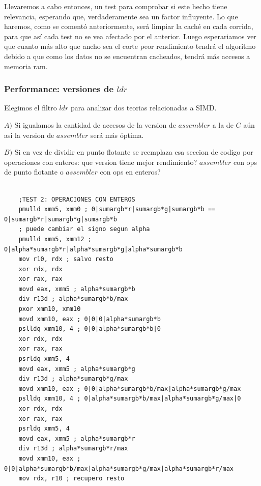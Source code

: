 Llevaremos a cabo entonces, un test para comprobar si este hecho tiene relevancia, esperando que, verdaderamente sea un factor influyente.
Lo que haremos, como se comentó anteriormente, será limpiar la caché en cada corrida, para que así cada test no se vea afectado por el anterior. Luego esperariamos ver que cuanto más alto que ancho sea el corte peor rendimiento tendrá el algoritmo debido a que como los datos no se encuentran cacheados, tendrá más accesos a memoria ram. \\

\subsubsection{Performance: versiones de $ldr$}

Elegimos el filtro $ldr$ para analizar dos teorias relacionadas a SIMD. 

$A)$ Si igualamos la cantidad de accesos de la version de $assembler$ a la de $C$ aún asi la version de $assembler$ será más óptima.

$B)$ Si en vez de dividir en punto flotante se reemplaza esa seccion de codigo por operaciones con enteros: que version tiene mejor rendimiento? $assembler$ con ops de punto flotante o $assembler$ con ops en enteros?


\begin{codesnippet}
\begin{verbatim}
                
    ;TEST 2: OPERACIONES CON ENTEROS
    pmulld xmm5, xmm0 ; 0|sumargb*r|sumargb*g|sumargb*b == 0|sumargb*r|sumargb*g|sumargb*b
    ; puede cambiar el signo segun alpha
    pmulld xmm5, xmm12 ; 0|alpha*sumargb*r|alpha*sumargb*g|alpha*sumargb*b 
    mov r10, rdx ; salvo resto
    xor rdx, rdx
    xor rax, rax
    movd eax, xmm5 ; alpha*sumargb*b
    div r13d ; alpha*sumargb*b/max
    pxor xmm10, xmm10
    movd xmm10, eax ; 0|0|0|alpha*sumargb*b
    pslldq xmm10, 4 ; 0|0|alpha*sumargb*b|0
    xor rdx, rdx
    xor rax, rax
    psrldq xmm5, 4
    movd eax, xmm5 ; alpha*sumargb*g
    div r13d ; alpha*sumargb*g/max
    movd xmm10, eax ; 0|0|alpha*sumargb*b/max|alpha*sumargb*g/max
    pslldq xmm10, 4 ; 0|alpha*sumargb*b/max|alpha*sumargb*g/max|0
    xor rdx, rdx
    xor rax, rax
    psrldq xmm5, 4
    movd eax, xmm5 ; alpha*sumargb*r
    div r13d ; alpha*sumargb*r/max
    movd xmm10, eax ; 0|0|alpha*sumargb*b/max|alpha*sumargb*g/max|alpha*sumargb*r/max
    mov rdx, r10 ; recupero resto
                
\end{verbatim}
\end{codesnippet}


